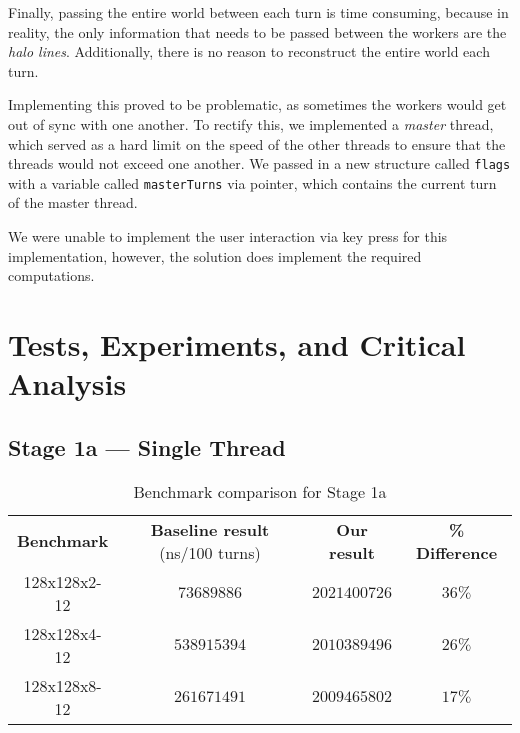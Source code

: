 \documentclass[10pt,a4paper,dvipsnames,cmyk]{scrartcl}
\begin{document}
\begin{multicols}{2}
Finally, passing the entire world between each turn is time consuming,
because in reality, the only information that needs to be passed between
the workers are the \textit{halo lines}. Additionally, there is no reason
to reconstruct the entire world each turn.

Implementing this proved to be problematic, as sometimes the workers would
get out of sync with one another. To rectify this, we implemented a
\textit{master} thread, which served as a hard limit on the speed of the
other threads to ensure that the threads would not exceed one another. We
passed in a new structure called \texttt{flags} with a variable called
\texttt{masterTurns} via pointer, which contains the current turn of the
master thread.

We were unable to implement the user interaction via key press for this
implementation, however, the solution does implement the required
computations.
\end{multicols}

\newpage
\section*{Tests, Experiments, and Critical Analysis}%
\label{sec:experiment-and-analysis}

\subsection*{Stage 1a --- Single Thread}%
\label{sub:single-thread}

\begin{table}[!htb]
\caption{Benchmark comparison for Stage 1a}
\begin{center}
    \begin{tabular}{|c|c|c|c|}
        \hline
        \textbf{Benchmark} & \textbf{Baseline result} (ns/100 turns) &
        \textbf{Our result} & \textbf{\% Difference} \\ \hhline{|=|=|=|=|}
        128x128x2-12 & $73689886$ & $2021400726$ & $36\%$ \\ \hline
        128x128x4-12 & $538915394$ & $2010389496$ & $26\%$ \\ \hline
        128x128x8-12 & $261671491$ & $2009465802$ & $17\%$ \\ \hline
    \end{tabular}
\end{center}
\end{table}
\end{document}
